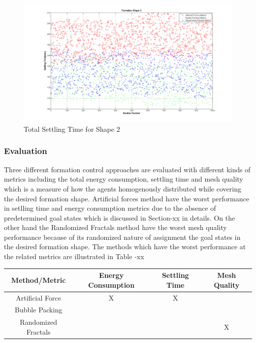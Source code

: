 \documentclass[twoside]{article}
\begin{document}
		 \begin{figure}[H]
		 	\caption{Total Settling Time for Shape 2}
		 	\centerline{\includegraphics[scale = 0.35]{Total_Time_Shape_2}}
		 \end{figure} 
		 
		 
		
			 \subsubsection{Evaluation} 
		Three different formation control approaches are evaluated with different kinds of metrics including the total energy consumption, settling time and mesh quality which is a measure of how the agents homogenously distributed while covering the desired formation shape. Artificial forces method have the worst performance in setlling time and energy consumption metrics due to the absence of predetermined goal states which is discussed in Section-xx in details. On the other hand the Randomized Fractals method have the worst mesh quality performance because of its randomized nature of assignment the goal states in the desired formation shape. The methods which have the worst performance at the related metrics are illustrated in Table -xx
		
		
		\begin{center}
			 \label{tab:title} 
			\begin{tabular}{||c| c| c |c ||}
				
				\hline
				\textbf{Method/Metric} & \textbf{Energy Consumption}  & \textbf{Settling Time} & \textbf{Mesh Quality}\\ 
				\hline
				Artificial Force & X & X &  \\
				Bubble Packing & &  &  \\	
				Randomized Fractals & &  & X \\	
				\hline
			\end{tabular}
		\end{center}
		
\end{document}
